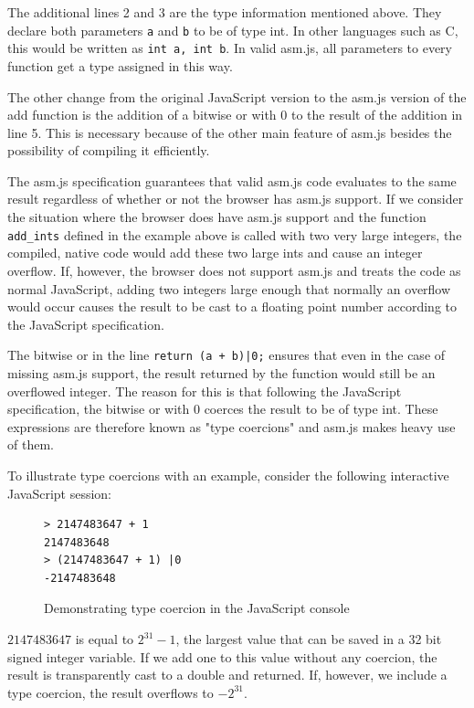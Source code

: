 \documentclass[11pt]{report}
\begin{document}
The additional lines 2 and 3 are the type information mentioned above. They declare both parameters \texttt{a} and \texttt{b} to be of type int. In other languages such as C, this would be written as \texttt{int a, int b}. In valid asm.js, all parameters to every function get a type assigned in this way.

The other change from the original JavaScript version to the asm.js version of the add function is the addition of a bitwise or with 0 to the result of the addition in line 5. This is necessary because of the other main feature of asm.js besides the possibility of compiling it efficiently. 

The asm.js specification \cite{asmjsspec} guarantees that valid asm.js code evaluates to the same result regardless of whether or not the browser has asm.js support. If we consider the situation where the browser does have asm.js support and the function \texttt{add_ints} defined in the example above is called with two very large integers, the compiled, native code would add these two large ints and cause an integer overflow. If, however, the browser does not support asm.js and treats the code as normal JavaScript, adding two integers large enough that normally an overflow would occur causes the result to be cast to a floating point number according to the JavaScript specification.

The bitwise or in the line \texttt{return (a + b)|0;} ensures that even in the case of missing asm.js support, the result returned by the function would still be an overflowed integer. The reason for this is that following the JavaScript specification, the bitwise or with 0 coerces the result to be of type int. These expressions are therefore known as "type coercions" and asm.js makes heavy use of them.

To illustrate type coercions with an example, consider the following interactive JavaScript session:

\begin{figure}[ht]
\begin{lstlisting}
> 2147483647 + 1
2147483648
> (2147483647 + 1) |0
-2147483648
\end{lstlisting}
\caption{Demonstrating type coercion in the JavaScript console}
\label{jstypecoercion}
\end{figure}

$2147483647$ is equal to $2^{31}-1$, the largest value that can be saved in a 32 bit signed integer variable. If we add one to this value without any coercion, the result is transparently cast to a double and returned. If, however, we include a type coercion, the result overflows to $-2^{31}$.
\end{document}
